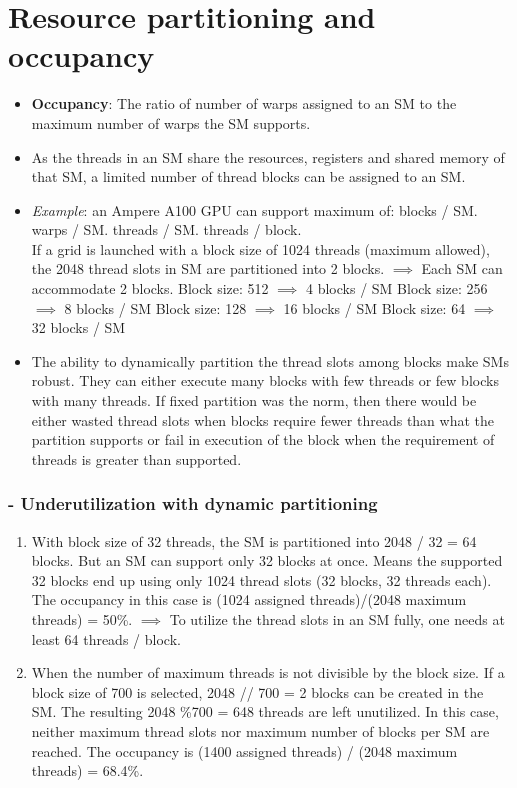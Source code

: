\section{Resource partitioning and occupancy}
\begin{itemize}
    \item \textbf{Occupancy}: The ratio of number of warps assigned to an SM to the maximum number of warps the SM supports.
    \item As the threads in an SM share the resources, registers and shared memory of that SM, a limited number of thread blocks can be assigned to an SM.
    \item \textsl{Example}: an Ampere A100 GPU can support maximum of:
           blocks / SM.
           warps / SM.
           threads / SM.
           threads / block.\\
          \linebreak
          If a grid is launched with a block size of 1024 threads (maximum allowed), the 2048 thread slots in SM are partitioned into 2 blocks. $\implies$ Each SM can accommodate 2 blocks.
          \subitem Block size: 512 $\implies$ 4 blocks / SM
          \subitem Block size: 256 $\implies$ 8 blocks / SM
          \subitem Block size: 128 $\implies$ 16 blocks / SM
          \subitem Block size: 64 $\implies$ 32 blocks / SM
    \item  The ability to dynamically partition the thread slots among blocks make SMs robust. They can either execute many blocks with few threads or few blocks with many threads.
          \subitem If fixed partition was the norm, then there would be either wasted thread slots when blocks require fewer threads than what the partition supports or fail in execution of the block when the requirement of threads is greater than supported.
\end{itemize}

\subsubsection{- Underutilization with dynamic partitioning}

\begin{enumerate}
    \item With block size of 32 threads, the SM is partitioned into 2048 / 32 = 64 blocks. But an SM can support only 32 blocks at once. Means the supported 32 blocks end up using only 1024 thread slots (32 blocks, 32 threads each). The occupancy in this case is (1024 assigned threads)/(2048 maximum threads) = 50\%. $\implies$ To utilize the thread slots in an SM fully, one needs at least 64 threads / block.
    \item When the number of maximum threads is not divisible by the block size. If a block size of 700 is selected, 2048 // 700 = 2 blocks can be created in the SM. The resulting 2048 \%700 = 648 threads are left unutilized. In this case, neither maximum thread slots nor maximum number of blocks per SM are reached. The occupancy is (1400 assigned threads) / (2048 maximum threads) = 68.4\%.
\end{enumerate}

